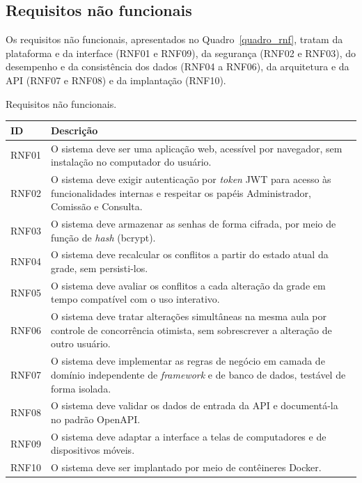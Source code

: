 \subsection{Requisitos não funcionais}
\label{sub_cap_requis_nao_func}

Os requisitos não funcionais, apresentados no Quadro~\ref{quadro_rnf}, tratam da plataforma e da interface (RNF01 e RNF09), da segurança (RNF02 e RNF03), do desempenho e da consistência dos dados (RNF04 a RNF06), da arquitetura e da API (RNF07 e RNF08) e da implantação (RNF10).

\begin{quadro}[H]
\centering
\small
\renewcommand{\arraystretch}{1.25}
\caption{Requisitos não funcionais.}
\label{quadro_rnf}
\begin{tabularx}{\textwidth}{|I|X|}
\hline
\textbf{ID} & \textbf{Descrição} \\ \hline
RNF01 & O sistema deve ser uma aplicação web, acessível por navegador, sem instalação no computador do usuário. \\ \hline
RNF02 & O sistema deve exigir autenticação por \textit{token} JWT para acesso às funcionalidades internas e respeitar os papéis Administrador, Comissão e Consulta. \\ \hline
RNF03 & O sistema deve armazenar as senhas de forma cifrada, por meio de função de \textit{hash} (bcrypt). \\ \hline
RNF04 & O sistema deve recalcular os conflitos a partir do estado atual da grade, sem persisti-los. \\ \hline
RNF05 & O sistema deve avaliar os conflitos a cada alteração da grade em tempo compatível com o uso interativo. \\ \hline
RNF06 & O sistema deve tratar alterações simultâneas na mesma aula por controle de concorrência otimista, sem sobrescrever a alteração de outro usuário. \\ \hline
RNF07 & O sistema deve implementar as regras de negócio em camada de domínio independente de \textit{framework} e de banco de dados, testável de forma isolada. \\ \hline
RNF08 & O sistema deve validar os dados de entrada da API e documentá-la no padrão OpenAPI. \\ \hline
RNF09 & O sistema deve adaptar a interface a telas de computadores e de dispositivos móveis. \\ \hline
RNF10 & O sistema deve ser implantado por meio de contêineres Docker. \\ \hline
\end{tabularx}
\end{quadro}

